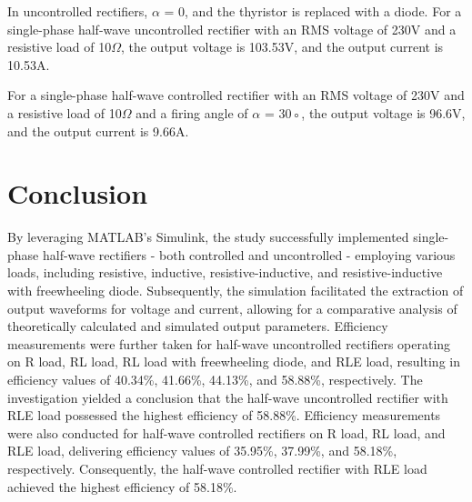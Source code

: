 In uncontrolled rectifiers, $ \alpha$ = 0, and the thyristor is replaced with a diode.
For a single-phase half-wave uncontrolled rectifier with an RMS voltage of 230V
and a resistive load of 10$ \Omega $,
the output voltage is 103.53V, and the output current is 10.53A.

For a single-phase half-wave controlled rectifier with an RMS voltage of 230V
and a resistive load of 10$ \Omega $ and a firing angle of $ \alpha  $ = 30◦, the output voltage
is 96.6V, and the output current is 9.66A.

\pagebreak











\section{Conclusion}


\hspace{\parindent}

By leveraging MATLAB's Simulink, the study successfully implemented single-phase half-wave rectifiers - both controlled and uncontrolled - employing various loads, including resistive, inductive, resistive-inductive, and resistive-inductive with freewheeling diode. Subsequently, the simulation facilitated the extraction of output waveforms for voltage and current, allowing for a comparative analysis of theoretically calculated and simulated output parameters. Efficiency measurements were further taken for half-wave uncontrolled rectifiers operating on R load, RL load, RL load with freewheeling diode, and RLE load, resulting in efficiency values of 40.34\%, 41.66\%, 44.13\%, and 58.88\%, respectively. The investigation yielded a conclusion that the half-wave uncontrolled rectifier with RLE load possessed the highest efficiency of 58.88\%. Efficiency measurements were also conducted for half-wave controlled rectifiers on R load, RL load, and RLE load, delivering efficiency values of 35.95\%, 37.99\%, and 58.18\%, respectively. Consequently, the half-wave controlled rectifier with RLE load achieved the highest efficiency of 58.18\%.

